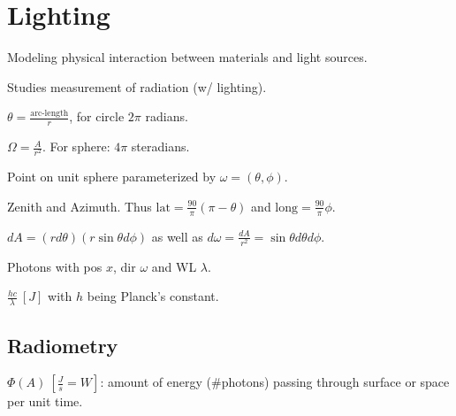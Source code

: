 \section{Lighting}

\begin{definition}[Lighting]
  Modeling physical interaction between materials and light sources.
\end{definition}

\begin{definition}[Radiometry]
  Studies measurement of radiation (w/ lighting).
\end{definition}

\begin{definition}[Angle]
  \(\theta = \frac{\text{arc-length}}{r}\), for circle \(2 \pi\) radians.
\end{definition}

\begin{definition}
  \(\Omega = \frac{A}{r^2}\).
  For sphere: \(4\pi\) steradians.
\end{definition}

\begin{definition}[Direction]
  Point on unit sphere parameterized by \(\omega = (\theta, \phi)\).

  Zenith and Azimuth.
  Thus \(\text{lat} =\frac{90}{\pi}(\pi - \theta)\) and \(\text{long} = \frac{90}{\pi}\phi\).
\end{definition}

\begin{definition}
  \(dA = (rd\theta)(r \sin \theta d \phi)\) as well as
  \(d\omega = \frac{dA}{r^2} = \sin \theta d \theta d \phi\).
\end{definition}

\begin{definition}
  Photons with pos \(x\), dir \(\omega\) and WL \(\lambda\).
\end{definition}

\begin{definition}
  \(\frac{hc}{\lambda} \ [J]\) with \(h\) being Planck's  constant.
\end{definition}

\subsection{Radiometry}
\begin{definition}
  \(\Phi(A) \ \left[\frac{J}{s} = W\right]\): amount of energy (\#photons) passing through surface or space per unit time.
\end{definition}


